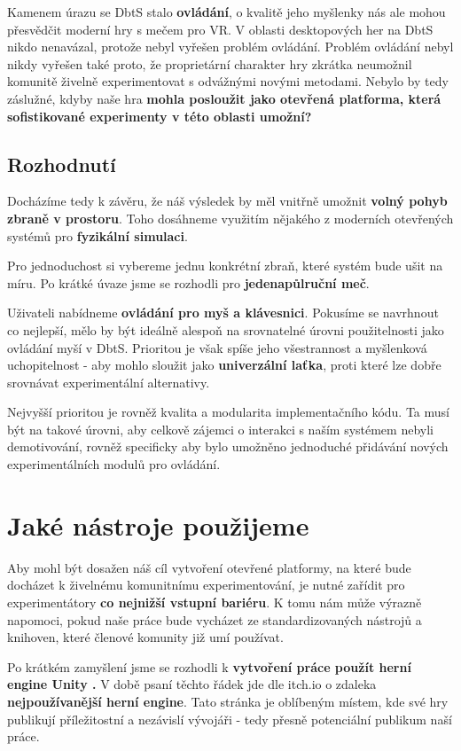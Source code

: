 Kamenem úrazu se \acl{DbtS} stalo \textbf{ovládání}, o kvalitě jeho myšlenky nás ale mohou přesvědčit moderní hry s mečem pro VR. V oblasti desktopových her na \acl{DbtS} nikdo nenavázal, protože nebyl vyřešen problém ovládání. Problém ovládání nebyl nikdy vyřešen také proto, že proprietární charakter hry zkrátka neumožnil komunitě živelně experimentovat s odvážnými novými metodami. Nebylo by tedy záslužné, kdyby naše hra \textbf{mohla posloužit jako otevřená platforma, která sofistikované experimenty v této oblasti umožní?} 

\subsection{Rozhodnutí}

Docházíme tedy k závěru, že náš výsledek by měl vnitřně umožnit \textbf{volný pohyb zbraně v prostoru}. Toho dosáhneme využitím nějakého z moderních otevřených systémů pro \textbf{fyzikální simulaci}.

Pro jednoduchost si vybereme jednu konkrétní zbraň, které systém bude ušit na míru. Po krátké úvaze jsme se rozhodli pro \textbf{jedenapůlruční meč}.

Uživateli nabídneme \textbf{ovládání pro myš a klávesnici}. Pokusíme se navrhnout co nejlepší, mělo by být ideálně alespoň na srovnatelné úrovni použitelnosti jako ovládání myší v \acs{DbtS}. Prioritou je však spíše jeho všestrannost a myšlenková uchopitelnost - aby mohlo sloužit jako \textbf{univerzální laťka}, proti které lze dobře srovnávat experimentální alternativy. 

Nejvyšší prioritou je rovněž kvalita a modularita implementačního kódu. Ta musí být na takové úrovni, aby celkově zájemci o interakci s naším systémem nebyli demotivování, rovněž specificky aby bylo umožněno jednoduché přidávání nových experimentálních modulů pro ovládání.

\section{Jaké nástroje použijeme}

Aby mohl být dosažen náš cíl vytvoření otevřené platformy, na které bude docházet k živelnému komunitnímu experimentování, je nutné zařídit pro experimentátory \textbf{co nejnižší vstupní bariéru}. K tomu nám může výrazně napomoci, pokud naše práce bude vycházet ze standardizovaných nástrojů a knihoven, které členové komunity již umí používat.
\bigbreak

Po krátkém zamyšlení jsme se rozhodli k \textbf{vytvoření práce použít herní engine Unity \cite{Unity}.} 
\bigbreak
V době psaní těchto řádek jde dle itch.io \cite{ItchIo} o zdaleka \textbf{nejpoužívanější herní engine}. Tato stránka je oblíbeným místem, kde své hry publikují příležitostní a nezávislí vývojáři - tedy přesně potenciální publikum naší práce. 

